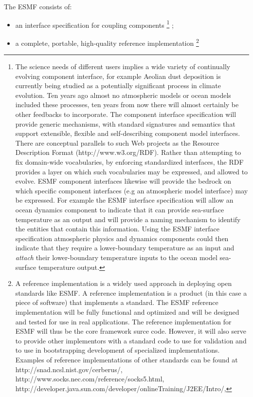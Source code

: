 \noindent The ESMF consists of:
\begin{itemize}
\item an interface specification for coupling components \footnote{
The science needs of different users
implies a wide variety of continually evolving component interface, for
example Aeolian dust deposition is currently being studied as a
potentially significant process in climate evolution. Ten years ago
almost no atmospheric models or ocean models included these processes,
ten years from now there will almost certainly be other feedbacks to
incorporate. The component interface specification will provide generic
mechanisms, with standard signatures and semantics that support
extensible, flexible and self-describing component model interfaces.
There are conceptual parallels to such Web projects as the
Resource Description Format (http://www.w3.org/RDF). Rather than
attempting to fix domain-wide vocabularies, by enforcing standardized
interfaces, the RDF provides a layer on which
such vocabularies may be expressed, and allowed to evolve. ESMF
component interfaces likewise will provide the bedrock on which specific
component interfaces (e.g an atmospheric model interface) may be expressed.
For example the ESMF interface specification will allow an ocean dynamics component
to indicate that it can provide sea-surface temperature as an output
and will provide a naming mechanism to identify the entities that contain this information. 
Using the ESMF interface specification atmospheric physics and dynamics components 
could then indicate that they require a lower-boundary temperature as an input and 
{\it attach} their lower-boundary temperature inputs to the ocean model sea-surface 
temperature output.
}
; 
\item a complete, portable, high-quality reference implementation
\footnote{
A reference implementation is a widely used approach in deploying open
standards like ESMF. A reference implementation is a product (in this
case a piece of software) that implements a standard. The ESMF reference 
implementation will be fully functional and optimized and will be designed and
tested for use in real applications. The reference implementation for ESMF
will thus be the core framework surce code.
However, it will also serve to
provide other implementors with a standard code to use for validation 
and to use in bootstrapping development of specialized implementations.
Examples of reference implementations of other standards can be found
at http://snad.ncsl.nist.gov/cerberus/,
http://www.socks.nec.com/reference/socks5.html, http://developer.java.sun.com/developer/onlineTraining/J2EE/Intro/,
}
\end{itemize}
